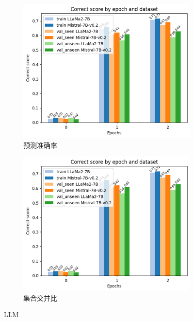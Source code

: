 \documentclass[bachelor]{thesis-uestc}
\begin{document}
\begin{figure}[htbp]
    \centering  %
    \begin{subfigure}[b]{0.48\textwidth}
        \centering    %
        \includegraphics[width=\textwidth]{2201-042817.png} %
        \caption{预测准确率}
        \label{fig:sub1}
    \end{subfigure}
    \hfill %
    \begin{subfigure}[b]{0.48\textwidth} 
        \centering    %
        \includegraphics[width=\textwidth]{2213-042817.png}
        \caption{集合交并比}
        \label{fig:sub2}
    \end{subfigure}
    \caption{LLM }    %
    \label{vproom}    %
\end{figure}
\end{document}
